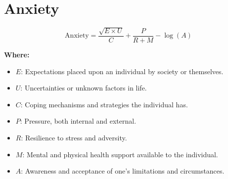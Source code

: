 \chapter{Anxiety}

\begin{equation}
\text{Anxiety} = \frac{\sqrt{E \times U}}{C} + \frac{P}{R + M} - \log{(A)}
\end{equation}

\textbf{Where:}

\begin{itemize}
    \item $E$: Expectations placed upon an individual by society or themselves.
    \item $U$: Uncertainties or unknown factors in life.
    \item $C$: Coping mechanisms and strategies the individual has.
    \item $P$: Pressure, both internal and external.
    \item $R$: Resilience to stress and adversity.
    \item $M$: Mental and physical health support available to the individual.
    \item $A$: Awareness and acceptance of one's limitations and circumstances.
\end{itemize}